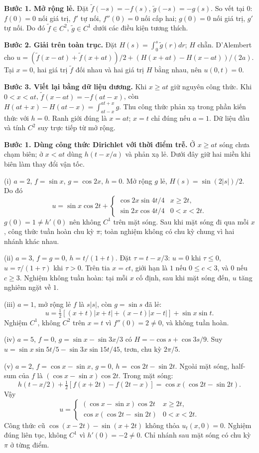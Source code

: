\textbf{Bước 1. Mở rộng lẻ.} Đặt $\widetilde f(-s)=-f(s)$, $\widetilde g(-s)=-g(s)$. So vết tại $0$: $f(0)=0$ nối giá trị, $f'$ tự nối, $f''(0)=0$ nối cấp hai; $g(0)=0$ nối giá trị, $g'$ tự nối. Do đó $\widetilde f\in C^2$, $\widetilde g\in C^1$ dưới các điều kiện tương thích.

\textbf{Bước 2. Giải trên toàn trục.} Đặt $H(s)=\int_0^s\widetilde g(r)dr$; $H$ chẵn. D'Alembert cho $u=(\widetilde f(x-at)+\widetilde f(x+at))/2+(H(x+at)-H(x-at))/(2a)$. Tại $x=0$, hai giá trị $\widetilde f$ đối nhau và hai giá trị $H$ bằng nhau, nên $u(0,t)=0$.

\textbf{Bước 3. Viết lại bằng dữ liệu dương.} Khi $x\ge at$ giữ nguyên công thức. Khi $0<x<at$, $\widetilde f(x-at)=-f(at-x)$, còn $H(at+x)-H(at-x)=\int_{at-x}^{at+x}g$. Thu công thức phản xạ trong phần kiến thức với $h=0$. Ranh giới đúng là $x=at$; $x=t$ chỉ đúng nếu $a=1$. Dữ liệu đầu và tính $C^2$ suy trực tiếp từ mở rộng.

\textbf{Bước 1. Dùng công thức Dirichlet với thời điểm trễ.} Ở $x\ge at$ sóng chưa chạm biên; ở $x<at$ dùng $h(t-x/a)$ và phản xạ lẻ. Dưới đây giữ hai miền khi biên làm thay đổi vận tốc.

(i) $a=2$, $f=\sin x$, $g=\cos2x$, $h=0$. Mở rộng $g$ lẻ, $H(s)=\sin(2|s|)/2$. Do đó
\[u=\sin x\cos2t+\begin{cases}\cos2x\sin4t/4&x\ge2t,\\\sin2x\cos4t/4&0<x<2t.\end{cases}\]
$g(0)=1\ne h'(0)$ nên không $C^1$ trên mặt sóng. Sau khi mặt sóng đi qua mỗi $x$, công thức tuần hoàn chu kỳ $\pi$; toàn nghiệm không có chu kỳ chung vì hai nhánh khác nhau.

(ii) $a=3$, $f=g=0$, $h=t/(1+t)$. Đặt $\tau=t-x/3$: $u=0$ khi $\tau\le0$, $u=\tau/(1+\tau)$ khi $\tau>0$. Trên tia $x=ct$, giới hạn là $1$ nếu $0\le c<3$, và $0$ nếu $c\ge3$. Nghiệm không tuần hoàn: tại mỗi $x$ cố định, sau khi mặt sóng đến, $u$ tăng nghiêm ngặt về $1$.

(iii) $a=1$, mở rộng lẻ $f$ là $s|s|$, còn $g=\sin s$ đã lẻ:
\[u=\tfrac12[(x+t)|x+t|+(x-t)|x-t|]+\sin x\sin t.\]
Nghiệm $C^1$, không $C^2$ trên $x=t$ vì $f''(0)=2\ne0$, và không tuần hoàn.

(iv) $a=5$, $f=0$, $g=\sin x-\sin3x/3$ có $H=-\cos s+\cos3s/9$. Suy $u=\sin x\sin5t/5-\sin3x\sin15t/45$, trơn, chu kỳ $2\pi/5$.

(v) $a=2$, $f=\cos x-\sin x$, $g=0$, $h=\cos2t-\sin2t$. Ngoài mặt sóng, half-sum của $f$ là $(\cos x-\sin x)\cos2t$. Trong mặt sóng:
\[h(t-x/2)+\tfrac12[f(x+2t)-f(2t-x)]=\cos x(\cos2t-\sin2t).\]
Vậy
\[u=\begin{cases}(\cos x-\sin x)\cos2t&x\ge2t,\\\cos x(\cos2t-\sin2t)&0<x<2t.\end{cases}\]
Công thức cũ $\cos(x-2t)-\sin(x+2t)$ không thỏa $u_t(x,0)=0$. Nghiệm đúng liên tục, không $C^1$ vì $h'(0)=-2\ne0$. Chỉ nhánh sau mặt sóng có chu kỳ $\pi$ ở từng điểm.

